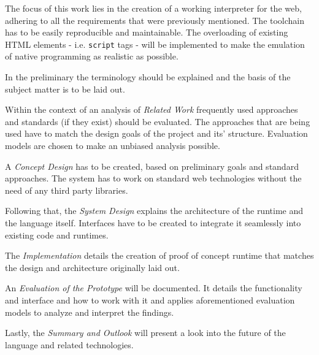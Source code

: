 \documentclass[oneside,11pt,xetex]{scrbook}
\begin{document}
The focus of this work lies in the creation of a working interpreter for the web, adhering to all the requirements that were previously mentioned. The toolchain has to be easily reproducible and maintainable. The overloading of existing HTML elements - i.e. \texttt{script} tags - will be implemented to make the emulation of native programming as realistic as possible.
\vspace{0.3cm}

In the preliminary the terminology should be explained and the basis of the subject matter is to be laid out.

Within the context of an analysis of \emph{Related Work} frequently used approaches and standards (if they exist) should be evaluated. The approaches that are being used have to match the design goals of the project and its' structure. Evaluation models are chosen to make an unbiased analysis possible.

A \emph{Concept Design} has to be created, based on preliminary goals and standard approaches. The system has to work on standard web technologies without the need of any third party libraries.

Following that, the \emph{System Design} explains the architecture of the runtime and the language itself. Interfaces have to be created to integrate it seamlessly into existing code and runtimes.

The \emph{Implementation} details the creation of proof of concept runtime that matches the design and architecture originally laid out.

An \emph{Evaluation of the Prototype} will be documented. It details the functionality and interface and how to work with it and applies aforementioned evaluation models to analyze and interpret the findings.

Lastly, the \emph{Summary and Outlook} will present a look into the future of the language and related technologies.




\end{document}
